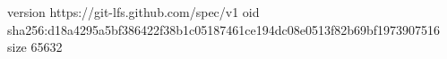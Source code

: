 version https://git-lfs.github.com/spec/v1
oid sha256:d18a4295a5bf386422f38b1c05187461ce194dc08e0513f82b69bf1973907516
size 65632
